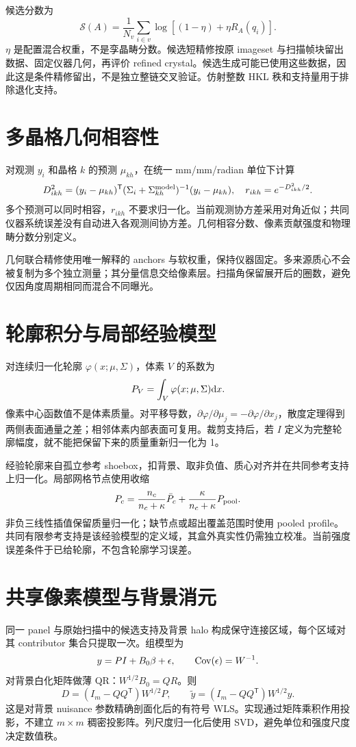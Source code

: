 候选分数为
\begin{equation}
\mathcal S(A)=\frac1{N_v}\sum_{i\in v}
\log[(1-\eta)+\eta R_A(q_i)].
\end{equation}
$\eta$ 是配置混合权重，不是孪晶畴分数。候选短精修按原 imageset 与扫描帧块留出数据、固定仪器几何，再评价 refined crystal。候选生成可能已使用这些数据，因此这是条件精修留出，不是独立整链交叉验证。仿射整数 HKL 秩和支持量用于排除退化支持。
\section{多晶格几何相容性}
对观测 $y_i$ 和晶格 $k$ 的预测 $\mu_{kh}$，在统一 mm/mm/radian 单位下计算
\begin{equation}
D_{ikh}^2=(y_i-\mu_{kh})^{\mathsf T}
(\Sigma_i+\Sigma_{kh}^{\rm model})^{-1}(y_i-\mu_{kh}),\quad
r_{ikh}=e^{-D_{ikh}^2/2}.
\end{equation}
多个预测可以同时相容，$r_{ikh}$ 不要求归一化。当前观测协方差采用对角近似；共同仪器系统误差没有自动进入各观测间协方差。几何相容分数、像素贡献强度和物理畴分数分别定义。

几何联合精修使用唯一解释的 anchors 与软权重，保持仪器固定。多来源质心不会被复制为多个独立测量；其分量信息交给像素层。扫描角保留展开后的圈数，避免仅因角度周期相同而混合不同曝光。
\section{轮廓积分与局部经验模型}
对连续归一化轮廓 $\varphi(x;\mu,\Sigma)$，体素 $V$ 的系数为
\begin{equation}
P_V=\int_V\varphi(x;\mu,\Sigma)\mathrm{d} x.
\end{equation}
像素中心函数值不是体素质量。对平移导数，$\partial\varphi/\partial\mu_j=-\partial\varphi/\partial x_j$，散度定理得到两侧表面通量之差；相邻体素内部表面可复用。裁剪支持后，若 $I$ 定义为完整轮廓幅度，就不能把保留下来的质量重新归一化为 1。

经验轮廓来自孤立参考 shoebox，扣背景、取非负值、质心对齐并在共同参考支持上归一化。局部网格节点使用收缩
\begin{equation}
P_c=\frac{n_c}{n_c+\kappa}\bar P_c+
\frac{\kappa}{n_c+\kappa}P_{\rm pool}.
\end{equation}
非负三线性插值保留质量归一化；缺节点或超出覆盖范围时使用 pooled profile。共同有限参考支持是该经验模型的定义域，其盒外真实性仍需独立校准。当前强度误差条件于已给轮廓，不包含轮廓学习误差。
\section{共享像素模型与背景消元}
同一 panel 与原始扫描中的候选支持及背景 halo 构成保守连接区域，每个区域对其 contributor 集合只提取一次。组模型为
\begin{equation}
y=PI+B_0\beta+\epsilon,\qquad\operatorname{Cov}(\epsilon)=W^{-1}.
\end{equation}
对背景白化矩阵做薄 QR：$W^{1/2}B_0=QR$。则
\begin{equation}
D=(I_m-QQ^{\mathsf T})W^{1/2}P,\qquad
\widetilde y=(I_m-QQ^{\mathsf T})W^{1/2}y.
\end{equation}
这是对背景 nuisance 参数精确剖面化后的有符号 WLS。实现通过矩阵乘积作用投影，不建立 $m\times m$ 稠密投影阵。列尺度归一化后使用 SVD，避免单位和强度尺度决定数值秩。

